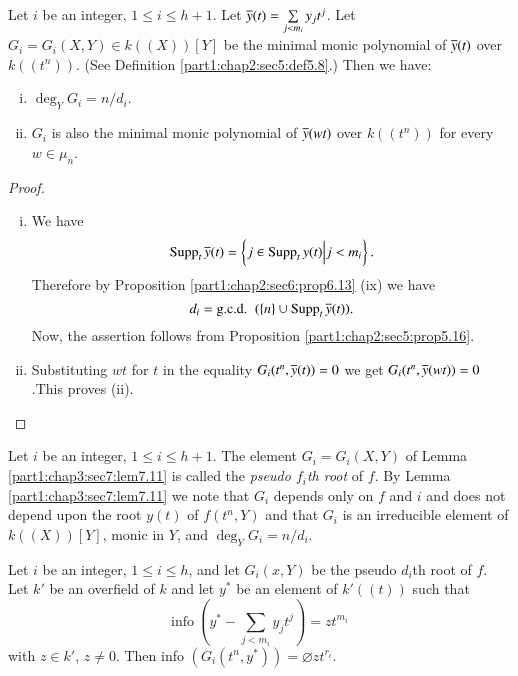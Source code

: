 \begin{lemma}\label{part1:chap3:sec7:lem7.11}
  Let $i$ be an integer, $1 \leq i \leq h+1$. Let $\overline{y}(t)= \sum\limits_{j< m_i} y_j t^j$. Let $G_i = G_i (X, Y) \in k ((X))[Y]$ be the minimal monic polynomial of $\overline{y} (t)$ over $k((t^n))$. (See Definition \ref{part1:chap2:sec5:def5.8}.) Then we have:
\begin{enumerate}[(i)]
\item $\deg_Y G_i =n/d_i$.
\item $G_i$ is also the minimal monic polynomial of $\overline{y}(wt)$ over $k ((t^n))$ for every $w \in \mu_n$.
\end{enumerate}
\end{lemma}

\begin{proof}
~
  \begin{enumerate}[(i)]
  \item We have
    $$
    \operatorname{Supp}_t \overline{y} (t) = \left\{ j \in \operatorname{Supp}_t y(t) \Big| j < m_i \right\}.
    $$
    Therefore by Proposition \ref{part1:chap2:sec6:prop6.13} (ix) we have 
    $$
    d_i = \text{{g.c.d.}\kern.3em}~ (\{ n\} \cup \operatorname{Supp}_t \overline{y} (t)).
    $$
    Now, the assertion follows from Proposition \ref{part1:chap2:sec5:prop5.16}.
    \item Substituting $wt$ for $t$ in the equality $G_i(t^n, \overline{y}
      (t))=0$ we get \break $G_i(t^n, \overline{y} (wt))=0$.\pageoriginale This
      proves (ii). 
  \end{enumerate}
\end{proof}

\begin{defi}\label{part1:chap3:sec7:def7.12}
  Let $i$ be an integer, $1 \leq i \leq h+1$. The element $G_i = G_i (X, Y)$ of Lemma \ref{part1:chap3:sec7:lem7.11} is called the {\em pseudo $f_i$th root} of $f$. By Lemma \ref{part1:chap3:sec7:lem7.11} we note that $G_i$ depends only on $f$ and $i$ and does not depend upon the root $y(t)$ of $f(t^n, Y)$ and that $G_i$ is an irreducible element of $k((X))[Y]$, monic in $Y$, and $\deg_Y G_i = n/d_i$.
\end{defi}

\begin{lemma}\label{part1:chap3:sec7:lem7.13}
  Let $i$ be an integer, $1 \leq i \leq h$, and let $G_i (x, Y)$ be the pseudo $d_i$th root of $f$. Let $k'$ be an overfield of $k$ and let $y^*$ be an element of $k'((t))$ such that
$$
\text{info}~ (y^* - \sum_{j < m_i} y_j t^j) = zt^{m_i}
$$
with $z \in k'$, $z \neq 0$. Then info $(G_i (t^n, y^*)) = \diameter zt^{r_i}$.
\end{lemma}

